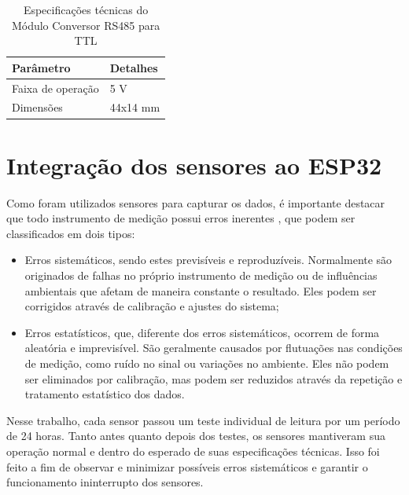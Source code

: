 \begin{table}[!htb]
  \caption{Especificações técnicas do Módulo Conversor RS485 para TTL}
  \begin{tabularx}{\textwidth}{|X|X|} \hline
      \textbf{Parâmetro} & \textbf{Detalhes} \\ \hline
      Faixa de operação & 5 V \\ \hline
      Dimensões & 44x14 mm \\ \hline
  \end{tabularx}
  \label{tab:rs485}
\end{table}

\section{Integração dos sensores ao ESP32}

Como foram utilizados sensores para capturar os dados, é importante destacar que todo instrumento de medição possui erros inerentes \parencite{Vuolo_erro1996}, que podem ser classificados em dois tipos:

\begin{itemize} 
    \item Erros sistemáticos, sendo estes previsíveis e reproduzíveis. Normalmente são originados de falhas no próprio instrumento de medição ou de influências ambientais que afetam de maneira constante o resultado. Eles podem ser corrigidos através de calibração e ajustes do sistema;
    \item Erros estatísticos, que, diferente dos erros sistemáticos, ocorrem de forma aleatória e imprevisível. São geralmente causados por flutuações nas condições de medição, como ruído no sinal ou variações no ambiente. Eles não podem ser eliminados por calibração, mas podem ser reduzidos através da repetição e tratamento estatístico dos dados. 
\end{itemize}


Nesse trabalho, cada sensor passou um teste individual de leitura por um período de 24 horas. Tanto antes quanto depois dos testes, os sensores mantiveram sua operação normal e dentro do esperado de suas especificações técnicas. Isso foi feito a fim de observar e minimizar possíveis erros sistemáticos e garantir o funcionamento ininterrupto dos sensores.

